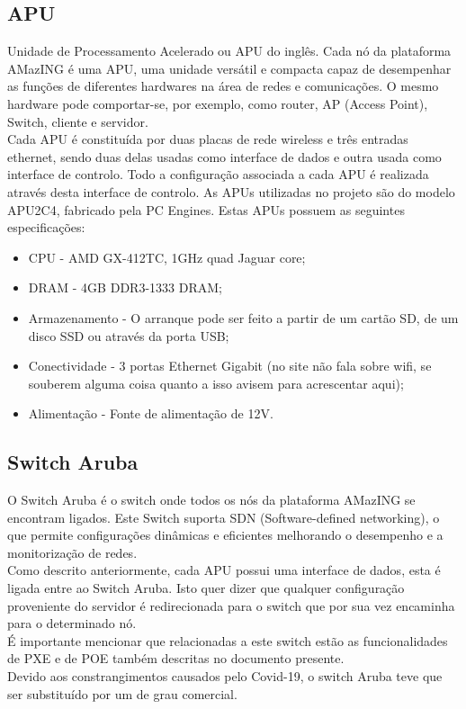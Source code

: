 \subsection{APU}
Unidade de Processamento Acelerado ou APU do inglês. Cada nó da plataforma AMazING é uma APU, uma unidade versátil e compacta capaz de desempenhar as funções de diferentes hardwares na área de redes e comunicações. O mesmo hardware pode comportar-se, por exemplo, como router, AP (Access Point), Switch, cliente e servidor.\cite{apu}\newline\\
Cada APU é constituída por duas placas de rede wireless e três entradas ethernet, sendo duas delas usadas como interface de dados e outra usada como interface de controlo. Todo a configuração associada a cada APU é realizada através desta interface de controlo.\newline
As APUs utilizadas no projeto são do modelo APU2C4, fabricado pela PC Engines. Estas APUs possuem as seguintes especificações:
\begin{itemize}
    \item CPU - AMD GX-412TC, 1GHz quad Jaguar core;
    \item DRAM - 4GB DDR3-1333 DRAM;
    \item Armazenamento - O arranque pode ser feito a partir de um cartão SD, de um disco SSD ou através da porta USB;
    \item Conectividade - 3 portas Ethernet Gigabit (no site não fala sobre wifi, se souberem alguma coisa quanto a isso avisem para acrescentar aqui);
    \item Alimentação - Fonte de alimentação de 12V.
\end{itemize}

\subsection{Switch Aruba}
O Switch Aruba é o switch onde todos os nós da plataforma AMazING se encontram ligados. Este Switch suporta SDN (Software-defined networking), o que permite configurações dinâmicas e eficientes melhorando o desempenho e a monitorização de redes.\cite{switch}\newline\\
Como descrito anteriormente, cada APU possui uma interface de dados, esta é ligada entre ao Switch Aruba. Isto quer dizer que qualquer configuração proveniente do servidor é redirecionada para o switch que por sua vez encaminha para o determinado nó.\newline\\
É importante mencionar que relacionadas a este switch estão as funcionalidades de PXE e de POE também descritas no documento presente.\newline\\
Devido aos constrangimentos causados pelo Covid-19, o switch Aruba teve que ser substituído por um de grau comercial.


